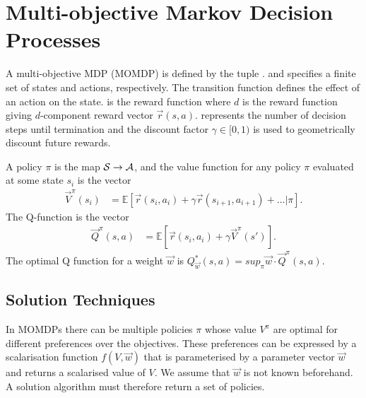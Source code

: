 \section{Multi-objective Markov Decision Processes}
\label{sec:momdps}

A multi-objective MDP (MOMDP) is defined by the tuple {\footnotesize \MDPTuple}. {\footnotesize \State} and {\footnotesize \Action} specifies a finite set of states and actions, respectively. The transition function {\footnotesize \TransFunc } defines the effect of an action on the state. {\footnotesize \MORewardFunc} is the reward function where $ d $ is the reward function giving $ d $-component reward vector {\footnotesize $ \vec{r}(s, a) $}. {\footnotesize \Horizon} represents the number of decision steps until termination and the discount factor {\footnotesize $\gamma \in [0, 1)$} is used to geometrically discount future rewards.

A policy {\footnotesize $ \pi $} is the map {\footnotesize $ \mathcal{S} \rightarrow \mathcal{A} $}, and the value function for any policy {\footnotesize $ \pi $} evaluated at some state {\footnotesize $ s_i $} is the vector
{\footnotesize
\begin{align}
    \vec{V}^{\pi}\left( s_i \right) &= \mathbb{E}\left[ \vec{r}(s_i, a_i) + \gamma \vec{r}(s_{i + 1}, a_{i + 1}) + \ldots | \pi \right].
\end{align}
}
The Q-function is the vector 
{\footnotesize
\begin{align}
    \vec{Q}^{\pi}\left(s, a\right) &= \mathbb{E}\left[ \vec{r}(s_i, a_i) + \gamma \vec{V}^{\pi}\left(s' \right) \right].
\end{align}
}
The optimal Q function for a weight {\footnotesize $ \vec{w} $} is {\footnotesize $ Q^{*}_{\vec{w}}\left( s, a\right) = sup_{\pi} \vec{w} \cdot \vec{Q}^{\pi}\left( s, a\right)$}.

\subsection{Solution Techniques}

In MOMDPs there can be multiple policies {\footnotesize $ \pi $} whose value {\footnotesize $ V^{\pi} $} are optimal for different preferences over the objectives. These preferences can be expressed by a scalarisation function {\footnotesize $ f\left( V, \vec{w} \right) $} that is parameterised by a parameter vector {\footnotesize $ \vec{w} $} and returns a scalarised value of {\footnotesize $ V $}. We assume that {\footnotesize $ \vec{w} $} is not known beforehand. A solution algorithm must therefore return a set of policies.

